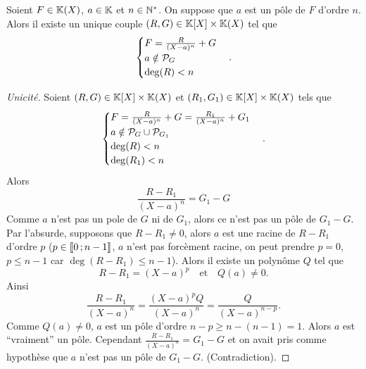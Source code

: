 \begin{lemme}
  Soient $F \in \K(X)$, $a \in \K$ et $n \in \N^*$. On suppose que $a$ est un pôle de $F$ d'ordre $n$. Alors il existe un unique couple $(R,G) \in \K[X] \times \K(X)$ tel que
  \begin{equation}
    \begin{cases} F = \frac{R}{(X-a)^n} +G \\ a\notin \P_G \\ \deg(R)<n \end{cases}.
  \end{equation}
\end{lemme}
\begin{proof}[Unicité]
  Soient $(R,G) \in \K[X] \times \K(X)$ et $(R_1,G_1) \in \K[X] \times \K(X)$ tels que
\begin{equation}
    \begin{cases} F = \frac{R}{(X-a)^n} +G=\frac{R_1}{(X-a)^n} +G_1 \\ a\notin \P_G\cup\P_{G_1} \\ \deg(R)<n \\ \deg(R_1)<n \end{cases}.
  \end{equation}
  Alors
  \begin{equation}
    \frac{R-R_1}{(X-a)^n}=G_1-G
  \end{equation}
  Comme $a$ n'est pas un pole de $G$ ni de $G_1$, alors ce n'est pas un pôle de $G_1-G$. Par l'absurde, supposons que $R-R_1\neq 0$, alors $a$ est une racine de $R-R_1$ d'ordre $p$ ($p \in \intervalleentier{0}{n-1}$, $a$ n'est pas forcèment racine, on peut prendre $p=0$, $p\leq n-1$ car $\deg(R-R_1)\leq n-1$). Alors il existe un polynôme $Q$ tel que
  \begin{equation}
    R-R_1=(X-a)^p \quad \text{et} \quad Q(a)\neq 0.
  \end{equation}
Ainsi
\begin{equation}
  \frac{R-R_1}{(X-a)^n} = \frac{(X-a)^pQ}{(X-a)^n} = \frac{Q}{(X-a)^{n-p}}.
\end{equation}
Comme $Q(a)\neq 0$, $a$ est un pôle d'ordre $n-p\geq n-(n-1)=1$. Alors $a$ est ``vraiment'' un pôle. Cependant $\frac{R-R_1}{(X-a)^n}=G_1-G$ et on avait pris comme hypothèse que $a$ n'est pas un pôle de $G_1-G$. (Contradiction).
\end{proof}
